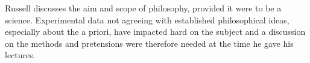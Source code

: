\documentclass{article}
\begin{document}
\maketitle

Russell discusses the aim and scope of philosophy, provided it were to be a science. Experimental data not agreeing with established philosophical ideas, especially about the a priori, have impacted hard on the subject and a discussion on the methods and pretensions were therefore needed at the time he gave his lectures.
\end{document}
